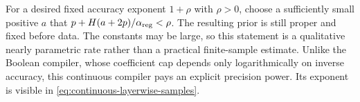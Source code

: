 For a desired fixed accuracy exponent $1+\rho$ with $\rho>0$, choose a sufficiently small positive $a$ that
$p+H(a+2p)/\alpha_{\rm reg}<\rho$. The resulting prior is still proper and fixed before data. The constants may be large, so this statement is a qualitative nearly parametric rate rather than a practical finite-sample estimate. Unlike the Boolean compiler, whose coefficient cap depends only logarithmically on inverse accuracy, this continuous compiler pays an explicit precision power. Its exponent is visible in \eqref{eq:continuous-layerwise-samples}.
